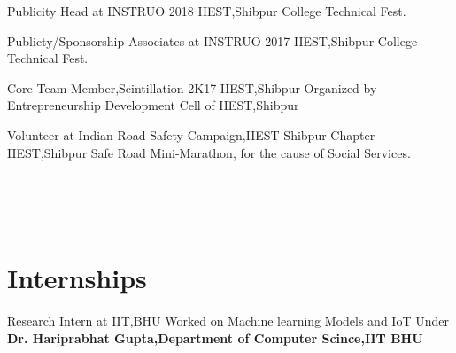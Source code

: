 \documentclass[]{cv-style}          %
\begin{document}
\begin{entrylist}
\entry
{}
{Publicity Head at INSTRUO 2018}
{IIEST,Shibpur}
{College Technical Fest.}

\end{entrylist}
\begin{entrylist}
\entry
{}
{Publicty/Sponsorship Associates at INSTRUO 2017}
{IIEST,Shibpur}
{College Technical Fest.}

\end{entrylist}
\begin{entrylist}
\entry
{}
{Core Team Member,Scintillation 2K17 }
{IIEST,Shibpur}
{Organized by Entrepreneurship Development Cell of IIEST,Shibpur}

\end{entrylist}
\begin{entrylist}
\entry
{}
{Volunteer at Indian Road Safety Campaign,IIEST Shibpur Chapter }
{IIEST,Shibpur}
{Safe Road Mini-Marathon, for the cause of Social Services.}

\end{entrylist}\\\\\


\section{Internships}
  \vspace{-0.3cm}
\begin{entrylist}
\entry
{}
{ Research Intern at IIT,BHU}
{}
{Worked on Machine learning Models and IoT Under\textbf{ Dr. Hariprabhat Gupta,Department of Computer Scince,IIT BHU} }
\end{entrylist}\

\



\end{document}
